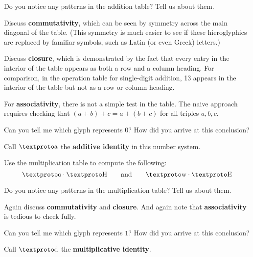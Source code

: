 \documentclass[nooutcomes,instructornotes]{ximera}
\begin{document}
\begin{problem} 
Do you notice any patterns in the addition table? Tell us about them.
\begin{teachingnote}
Discuss \textbf{commutativity}, which can be seen by symmetry across the main diagonal of the table.  (This symmetry is much easier to see if these hieroglyphics are replaced by familiar symbols, such as Latin (or even Greek) letters.)  

Discuss \textbf{closure}, which is demonstrated by the fact that every entry in the interior of the table appears as both a row and a column heading.  For comparison, in the operation table for single-digit addition, 13 appears in the interior of the table but not as a row or column heading.  

For \textbf{associativity}, there is not a simple test in the table.  The naive approach requires checking that $(a + b) + c = a + (b + c)$ for all triples $a, b, c$.  
\end{teachingnote}
\end{problem}

\begin{problem} 
Can you tell me which glyph represents $0$? How did you arrive at this
conclusion?
\begin{teachingnote}
Call $\lo$ the \textbf{additive identity} in this number system.
\end{teachingnote}
\end{problem}

\begin{problem} 
Use the multiplication table to compute the following:
\[
\li \cdot \lb \qquad\text{and}\qquad \la \cdot \lf
\]
\end{problem}

\begin{problem} 
Do you notice any patterns in the multiplication table? Tell us about them.
\begin{teachingnote}
Again discuss \textbf{commutativity} and \textbf{closure}.  And again note that \textbf{associativity} is tedious to check fully.  
\end{teachingnote}

\end{problem}

\begin{problem} 
Can you tell me which glyph represents $1$? How did you arrive at this
conclusion?
\begin{teachingnote}
Call $\loo$ the \textbf{multiplicative identity}.  
\end{teachingnote}
\end{problem}
\end{document}
